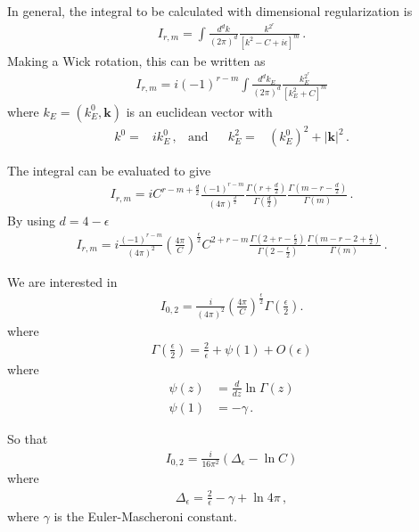 In general, the integral to be calculated with dimensional regularization is
\begin{align}
  I_{r, m}=\int \frac{d^{d} k}{(2 \pi)^{d}} \frac{k^{2^{r}}}{\left[k^{2}-C+i \epsilon\right]^{m}}\,.
\end{align}
Making a Wick rotation, this can be written as
\begin{align}
  I_{r, m}=i(-1)^{r-m} \int \frac{d^{d} k_{E}}{(2 \pi)^{d}} \frac{k_{E}^{2^{r}}}{\left[k_{E}^{2}+C\right]^{m}}
\end{align}
where $k_{E}=\left(k_{E}^{0}, \boldsymbol{k}\right)$ is an euclidean vector with
\begin{align}
  k^{0}=&i k_{E}^{0}\,,& \text{and} && k_{E}^{2}=&\left(k_{E}^{0}\right)^{2}+|\boldsymbol{k}|^{2}\,.
\end{align}


The integral can be evaluated to give
\begin{align}
  I_{r, m}=i C^{r-m+\frac{d}{2}} \frac{(-1)^{r-m}}{(4 \pi)^{\frac{d}{2}}} \frac{\Gamma\left(r+\frac{d}{2}\right)}{\Gamma\left(\frac{d}{2}\right)} \frac{\Gamma\left(m-r-\frac{d}{2}\right)}{\Gamma(m)}\,.
\end{align}
By using $d=4-\epsilon$
\begin{align}
  I_{r, m}=i \frac{(-1)^{r-m}}{(4 \pi)^{2}}\left(\frac{4 \pi}{C}\right)^{\frac{\epsilon}{2}} C^{2+r-m} \frac{\Gamma\left(2+r-\frac{\epsilon}{2}\right)}{\Gamma\left(2-\frac{\epsilon}{2}\right)} \frac{\Gamma\left(m-r-2+\frac{\epsilon}{2}\right)}{\Gamma(m)}\,.
\end{align}

We are interested in
\begin{align}
  I_{0,2}=\frac{i}{(4 \pi)^{2}}\left(\frac{4 \pi}{C}\right)^{\frac{\epsilon}{2}} \Gamma\left(\frac{\epsilon}{2}\right).
\end{align}
where
\begin{align}
  \Gamma\left(\frac{\epsilon}{2}\right)=\frac{2}{\epsilon}+\psi(1)+O(\epsilon)
\end{align}
where
\begin{align}
\psi(z) &=\frac{d}{d z} \ln \Gamma(z) \\ \psi(1) &=-\gamma \,.
\end{align}

So that
\begin{align}
  I_{0,2}=\frac{i}{16 \pi^{2}}\left(\Delta_{\epsilon}-\ln C\right)
\end{align}
where
\begin{align}
  \Delta_{\epsilon}=\frac{2}{\epsilon}-\gamma+\ln 4 \pi\,,
\end{align}
where $\gamma$ is the Euler-Mascheroni constant.


